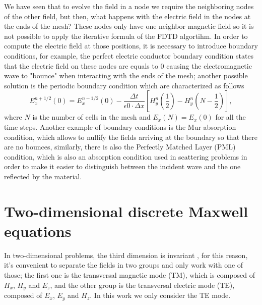\documentclass[12pt, oneside]{book}
\begin{document}
We have seen that to evolve the field in a node we require the neighboring nodes of the other field, but then, what happens with the electric field in the nodes at the ends of the mesh? These nodes only have one neighbor magnetic field so it is not possible to apply the iterative formula of the FDTD algortihm. In order to compute the electric field at those positions, it is necessary to introduce boundary conditions, for example, the perfect electric conductor boundary condition states that the electric field on these nodes are equals to $0$ causing the electromagnetic wave to "bounce" when interacting with the ends of the mesh; another possible solution is the periodic boundary condition which are characterized as follows
\begin{equation}
    E_x^{n+1/2}(0) = E_x^{n-1/2}(0) - \dfrac{\Delta t}{\epsilon 0 \cdot \Delta x}\left[H_{y}^{n}\left(\frac{1}{2}\right)-H_{y}^{n}\left(N-\frac{1}{2}\right)\right],
\end{equation} 
where $N$ is the number of cells in the mesh and $E_x(N) = E_x(0)$ for all the time steps. Another example of boundary conditions is the Mur absorption condition, which allows to nullify the fields arriving at the boundary so that there are no bounces, similarly, there is also the Perfectly Matched Layer (PML) condition, which is also an absorption condition used in scattering problems in order to make it easier to distinguish between the incident wave and the one reflected by the material.


\section{Two-dimensional discrete Maxwell equations}

In two-dimensional problems, the third dimension is invariant \cite{peterson1992electromagnetic}, for this reason, it's convenient to separate the fields in two groups and only work with one of those; the first one is the transversal magnetic mode (TM), which is composed of $H_x$, $H_y$ and $E_z$, and the other group is the transversal electric mode (TE), composed of $E_x$, $E_y$ and $H_z$. In this work we only consider the TE mode.
\end{document}
